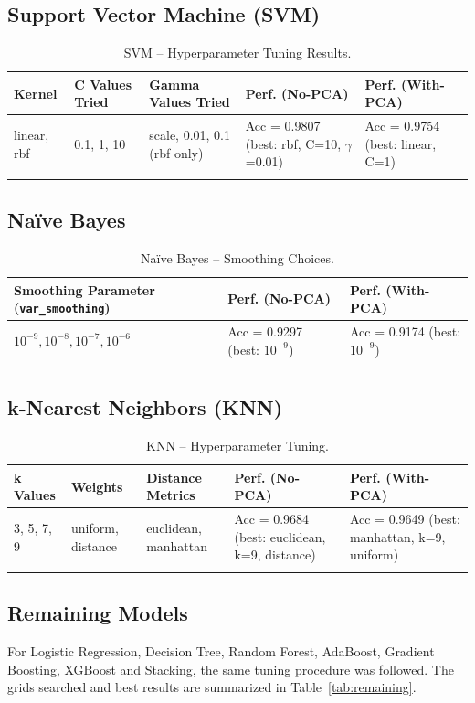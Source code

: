 \documentclass[12pt,a4paper]{article}
\begin{document}
\subsection{Support Vector Machine (SVM)}
\begin{longtable}{|p{2.3cm}|p{3cm}|p{2.7cm}|p{2.3cm}|p{2.3cm}|}
\hline
\textbf{Kernel} & \textbf{C Values Tried} & \textbf{Gamma Values Tried} & \textbf{Perf. (No-PCA)} & \textbf{Perf. (With-PCA)} \\ \hline
linear, rbf & 0.1, 1, 10 & scale, 0.01, 0.1 (rbf only) & Acc = 0.9807 (best: rbf, C=10, $\gamma$=0.01) & Acc = 0.9754 (best: linear, C=1) \\ \hline
\caption{SVM -- Hyperparameter Tuning Results.}
\label{tab:svm}
\end{longtable}

\subsection{Na\"ive Bayes}
\begin{longtable}{|p{5cm}|p{4cm}|p{4cm}|}
\hline
\textbf{Smoothing Parameter (\texttt{var\_smoothing})} & \textbf{Perf. (No-PCA)} & \textbf{Perf. (With-PCA)} \\ \hline
$10^{-9}, 10^{-8}, 10^{-7}, 10^{-6}$ & Acc = 0.9297 (best: $10^{-9}$) & Acc = 0.9174 (best: $10^{-9}$) \\ \hline
\caption{Na\"ive Bayes -- Smoothing Choices.}
\label{tab:nb}
\end{longtable}

\subsection{k-Nearest Neighbors (KNN)}
\begin{longtable}{|p{2cm}|p{2.7cm}|p{3cm}|p{3cm}|p{3cm}|}
\hline
\textbf{k Values} & \textbf{Weights} & \textbf{Distance Metrics} & \textbf{Perf. (No-PCA)} & \textbf{Perf. (With-PCA)} \\ \hline
3, 5, 7, 9 & uniform, distance & euclidean, manhattan & Acc = 0.9684 (best: euclidean, k=9, distance) & Acc = 0.9649 (best: manhattan, k=9, uniform) \\ \hline
\caption{KNN -- Hyperparameter Tuning.}
\label{tab:knn}
\end{longtable}

\subsection{Remaining Models}
For Logistic Regression, Decision Tree, Random Forest, AdaBoost, Gradient Boosting, XGBoost and Stacking, the same tuning procedure was followed. The grids searched and best results are summarized in Table~\ref{tab:remaining}.
\end{document}
